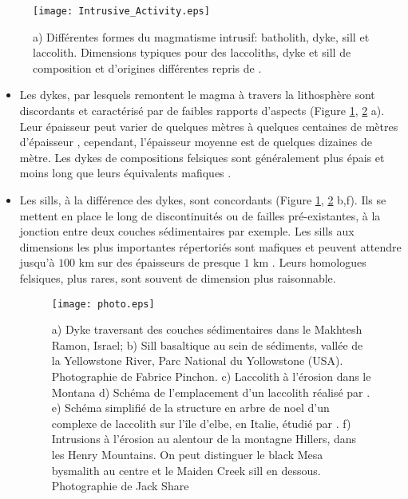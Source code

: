 \begin{figure}[h!]
  \begin{center}
    \graphicspath{ {/Users/thorey/Documents/These/Manuscript/Figure/Chapter1/} }
    \texttt{[image: Intrusive\_Activity.eps]}
    \caption{a) Différentes formes  du magmatisme intrusif: batholith,
      dyke,  sill   et  laccolith.    Dimensions  typiques   pour  des
      laccoliths,   dyke  et   sill  de   composition  et   d'origines
      différentes repris de \citet{Cruden:tg}. }
    \label{Dimension}
  \end{center}
\end{figure}

\begin{itemize}
\item  Les  dykes,  par  lesquels  remontent le  magma  à  travers  la
  lithosphère sont discordants et  caractérisé par de faibles rapports
  d'aspects (Figure \ref{Dimension}, \ref{picture} a).  Leur épaisseur
  peut  varier  de quelques  mètres  à  quelques centaines  de  mètres
  d'épaisseur      \citep{Walker:1989jq,Rubin:1995upa},     cependant,
  l'épaisseur moyenne est de quelques  dizaines de mètre. Les dykes de
  compositions felsiques  sont généralement  plus épais et  moins long
  que leurs équivalents mafiques \citep{Rubin:1995upa}.

\item Les sills,  à la différence des dykes,  sont concordants (Figure
  \ref{Dimension},  \ref{picture} b,f).   Ils se  mettent en  place le
  long de discontinuités  ou de failles pré-existantes,  à la jonction
  entre  deux  couches  sédimentaires  par  exemple.   Les  sills  aux
  dimensions les plus importantes répertoriés sont mafiques et peuvent
  attendre  jusqu'à $100$  km sur  des  épaisseurs de  presque $1$  km
  \citep{Cruden:tg}.   Leurs homologues  felsiques,  plus rares,  sont
  souvent de dimension plus raisonnable.

  \begin{figure}[h!]
    \begin{center}
      \graphicspath{ {/Users/thorey/Documents/These/Manuscript/Figure/Chapter1/} }
      \texttt{[image: photo.eps]}
      \caption{a) Dyke  traversant des  couches sédimentaires  dans le
        Makhtesh  Ramon,  Israel;  b)   Sill  basaltique  au  sein  de
        sédiments, vallée  de la  Yellowstone River, Parc  National du
        Yollowstone  (USA).   Photographie  de  Fabrice  Pinchon.   c)
        Laccolith   à  l'érosion   dans  le   Montana  d)   Schéma  de
        l'emplacement       d'un      laccolith       réalisé      par
        \citet{Gilbert:1877uk}. e) Schéma simplifié de la structure en
        arbre de noel d'un complexe  de laccolith sur l'île d'elbe, en
        Italie,  étudié par  \citet{Rocchi:2010dn}.   f) Intrusions  à
        l'érosion au alentour  de la montagne Hillers,  dans les Henry
        Mountains.   On peut  distinguer  le black  Mesa bysmalith  au
        centre et  le Maiden Creek  sill en dessous.   Photographie de
        Jack Share}
      \label{picture}
    \end{center}
  \end{figure}


\end{itemize}

